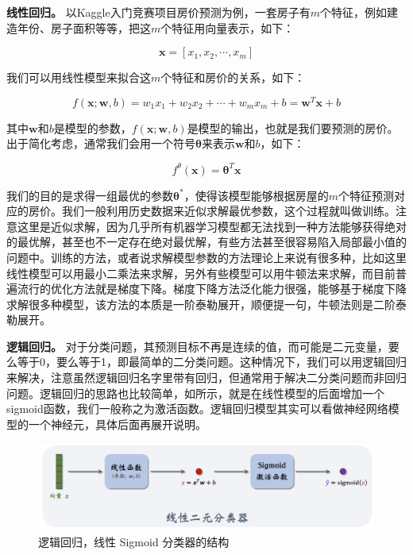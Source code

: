 {\bfseries 线性回归。} 以Kaggle入门竞赛项目房价预测为例，一套房子有$m$个特征，例如建造年份、房子面积等等，把这$m$个特征用向量表示，如下：

\begin{equation}
    \boldsymbol{x}=\left[x_1, x_2, \cdots, x_m\right]
\end{equation}

我们可以用线性模型来拟合这$m$个特征和房价的关系，如下：

\begin{equation}
    f(\boldsymbol{x} ; \boldsymbol{w}, b) = w_1 x_1+w_2 x_2+\cdots+w_m x_m+b = \boldsymbol{w}^T \boldsymbol{x}+b
\end{equation}

其中$\boldsymbol{w}$和$b$是模型的参数，$f(\boldsymbol{x} ; \boldsymbol{w}, b)$是模型的输出，也就是我们要预测的房价。出于简化考虑，通常我们会用一个符号$\boldsymbol{\theta}$来表示$\boldsymbol{w}$和$b$，如下：

\begin{equation}
    f^{\theta}(\boldsymbol{x}) = \boldsymbol{\theta}^T \boldsymbol{x}
\end{equation}

我们的目的是求得一组最优的参数$\boldsymbol{\theta^{*}}$，使得该模型能够根据房屋的$m$个特征预测对应的房价。我们一般利用历史数据来近似求解最优参数，这个过程就叫做训练。注意这里是近似求解，因为几乎所有机器学习模型都无法找到一种方法能够获得绝对的最优解，甚至也不一定存在绝对最优解，有些方法甚至很容易陷入局部最小值的问题中。训练的方法，或者说求解模型参数的方法理论上来说有很多种，比如这里线性模型可以用最小二乘法来求解，另外有些模型可以用牛顿法来求解，而目前普遍流行的优化方法就是梯度下降。梯度下降方法泛化能力很强，能够基于梯度下降求解很多种模型，该方法的本质是一阶泰勒展开，顺便提一句，牛顿法则是二阶泰勒展开。

{\bfseries 逻辑回归。} 对于分类问题，其预测目标不再是连续的值，而可能是二元变量，要么等于0，要么等于1，即最简单的二分类问题。这种情况下，我们可以用逻辑回归来解决，注意虽然逻辑回归名字里带有回归，但通常用于解决二分类问题而非回归问题。逻辑回归的思路也比较简单，如所示，就是在线性模型的后面增加一个sigmoid函数，我们一般称之为激活函数。逻辑回归模型其实可以看做神经网络模型的一个神经元，具体后面再展开说明。

\begin{figure}[hbt]
    \centering
    \includegraphics[width=0.5\linewidth]{ch4/figs/logistic_struction.png}
    \caption{逻辑回归，线性 Sigmoid 分类器的结构}
    \label{fig:logistic_struction}
\end{figure}

